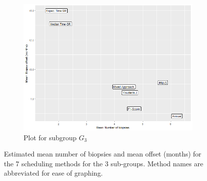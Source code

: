 \begin{figure}[!htb]
\begin{subfigure}[b]{0.45\textwidth}
		\includegraphics[width=\textwidth]{images/sim_study/meanNbVsOffset_scale_6.png}
		\caption{Plot for subgroup $G_3$}
		\label{fig : meanNbVsOffset_G3}
    \end{subfigure}      
    \caption{Estimated mean number of biopsies and mean offset (months) for the 7 scheduling methods for the 3 sub-groups. Method names are abbreviated for ease of graphing.}
\end{figure}

